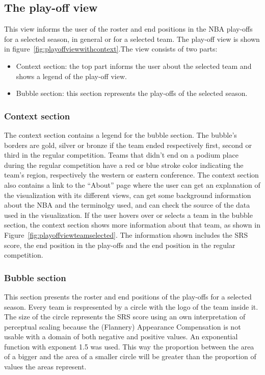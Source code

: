 \documentclass[]{sigchi}
\begin{document}
\subsection{The play-off view}
This view informs the user of the roster and end positions in the NBA play-offs
for a selected season, in general or for a selected team. The play-off view is 
shown in figure~\ref{fig:playoffviewwithcontext}.The view consists of
two parts: 
\begin{itemize}
    \item Context section: the top part informs the user about the selected team
    and shows a legend of the play-off view.
    \item Bubble section: this section represents the play-offs of the selected
    season.
\end{itemize}

\subsubsection{Context section}
The context section contains a legend for the bubble section. The bubble's
borders are gold, silver or bronze if the team ended respectively first, second
or third in the regular competition. Teams that didn't end on a podium place
during the regular competition have a red or blue stroke color indicating the
team's region, respectively the western or eastern conference. The context
section also contains a link to the ``About'' page where the user can get an
explanation of the visualization with its different views, can get some
background information about the NBA and the terminolgy used, and can check the
source of the data used in the visualization. If the user hovers over or selects 
a team in the bubble section, the context section shows more information about that 
team, as shown in Figure~\ref{fig:playoffviewteamselected}. The information shown 
includes the SRS score, the end position in the play-offs and the end position in 
the regular competition.

\subsubsection{Bubble section}
This section presents the roster and end positions of the play-offs for a
selected season. Every team is respresented by a circle with the logo of the
team inside it. The size of the circle represents the SRS score using an own
interpretation of perceptual scaling because the (Flannery) Appearance
Compensation is not usable with a domain of both negative and positive values.
An exponential function with exponent 1.5 was used. This way the proportion
between the area of a bigger and the area of a smaller circle will be greater
than the proportion of values the areas represent.
\end{document}
